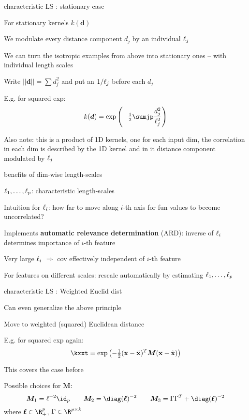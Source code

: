 \documentclass[11pt,compress,t,notes=noshow, xcolor=table]{beamer}
\begin{document}
\begin{framei}[sep=M]{characteristic LS : stationary case}
\item For stationary kernels $k(\bm{d})$ 
\item We modulate every distance component $d_j$ by an individual $\ell_j$
\item We can turn the isotropic examples from above into 
stationary ones -- with individual length scales
\item Write $||\bm{d}|| = \sum d_j^2$ and put an $1/\ell_j$ before each $d_j$
\item E.g. for squared exp:
$$
  k(\bm{d}) = \exp \left(- \tfrac{1}{2} \sumjp \frac{d_j^2}{\ell_j^2} \right)
$$
\item Also note: this is a product of 1D kernels, one for each input dim, the correlation in each dim is described by the 1D kernel and in it distance component modulated by $\ell_j$
\end{framei}


\begin{framei}[sep=L]{benefits of dim-wise length-scales}
\item $\ell_1,\dots, \ell_p$: characteristic length-scales
\item Intuition for $\ell_i$: how far to move along $i$-th axis for fun values to become uncorrelated?
\item Implements \textbf{automatic relevance determination} (ARD): inverse of $\ell_i$ determines importance of $i$-th feature
\item Very large $\ell_i$ $\Rightarrow$ cov effectively independent of $i$-th feature
\item For features on different scales: rescale automatically by estimating $\ell_1,\dots, \ell_p$ 
\end{framei}



\begin{framei}[sep=M]{characteristic LS : Weighted Euclid dist}

\item Can even generalize the above principle
\item Move to weighted (squared) Euclidean distance
\item E.g. for squared exp again: 
$$
\kxxt = \exp \left(- \tfrac{1}{2}(\xv - \xtil)^T\bm{M} (\xv - \xtil )\right)
$$
\item This covers the case before
\item Possible choices for $\bm{M}$:
$$
\bm{M}_1 = \ls^{-2}\id_p \qquad \bm{M}_2 = \diag(\bm{\ls})^{-2} \qquad \bm{M}_3 = \Gamma \Gamma^T + \diag(\bm{\ls})^{-2}
$$
where $\bm{\ls} \in \R^p_+$, $\Gamma \in \R^{p \times k}$ 
\end{framei}
\end{document}

